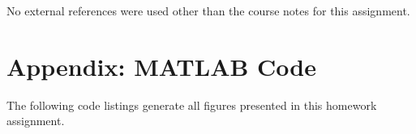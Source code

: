 \documentclass[12pt]{article}
\begin{document}
No external references were used other than the course notes for this assignment.

\section*{Appendix: MATLAB Code} %

The following code listings generate all figures presented in this homework assignment.


\end{document}
